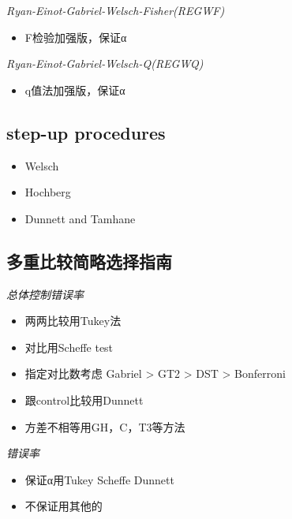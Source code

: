 \documentclass[]{tufte-book}
\providecommand{\tightlist}{%
  \setlength{\itemsep}{0pt}\setlength{\parskip}{0pt}}
\begin{document}
\emph{Ryan-Einot-Gabriel-Welsch-Fisher(REGWF)}

\begin{itemize}
\tightlist
\item
  F检验加强版，保证α
\end{itemize}

\emph{Ryan-Einot-Gabriel-Welsch-Q(REGWQ)}

\begin{itemize}
\tightlist
\item
  q值法加强版，保证α
\end{itemize}

\hypertarget{step-up-procedures}{%
\subsection{step-up procedures}\label{step-up-procedures}}

\begin{itemize}
\tightlist
\item
  Welsch
\item
  Hochberg
\item
  Dunnett and Tamhane
\end{itemize}

\hypertarget{ux591aux91cdux6bd4ux8f83ux7b80ux7565ux9009ux62e9ux6307ux5357}{%
\subsection{多重比较简略选择指南}\label{ux591aux91cdux6bd4ux8f83ux7b80ux7565ux9009ux62e9ux6307ux5357}}

\emph{总体控制错误率}

\begin{itemize}
\tightlist
\item
  两两比较用Tukey法
\item
  对比用Scheffe test
\item
  指定对比数考虑 Gabriel \textgreater{} GT2 \textgreater{} DST \textgreater{} Bonferroni
\item
  跟control比较用Dunnett
\item
  方差不相等用GH，C，T3等方法
\end{itemize}

\emph{错误率}

\begin{itemize}
\tightlist
\item
  保证α用Tukey Scheffe Dunnett
\item
  不保证用其他的
\end{itemize}
\end{document}
